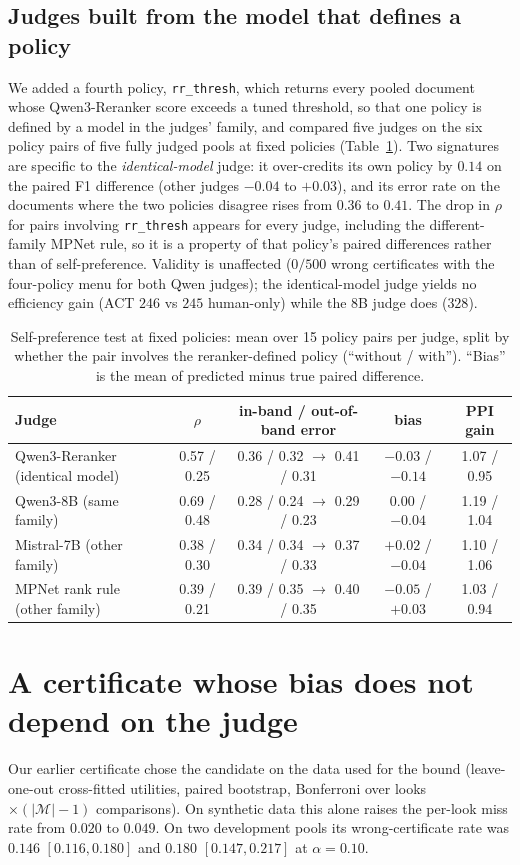 \documentclass{article}
\begin{document}
\subsection{Judges built from the model that defines a policy}\label{sec:selfpref}
We added a fourth policy, \texttt{rr\_thresh}, which returns every pooled document whose Qwen3-Reranker score exceeds a tuned threshold, so that one policy is defined by a model in the judges' family, and compared five judges on the six policy pairs of five fully judged pools at fixed policies (Table~\ref{tab:selfpref}). Two signatures are specific to the \emph{identical-model} judge: it over-credits its own policy by $0.14$ on the paired F1 difference (other judges $-0.04$ to $+0.03$), and its error rate on the documents where the two policies disagree rises from $0.36$ to $0.41$. The drop in $\rho$ for pairs involving \texttt{rr\_thresh} appears for every judge, including the different-family MPNet rule, so it is a property of that policy's paired differences rather than of self-preference. Validity is unaffected ($0/500$ wrong certificates with the four-policy menu for both Qwen judges); the identical-model judge yields no efficiency gain (ACT $246$ vs $245$ human-only) while the 8B judge does ($328$).

\begin{table}[t]\centering\footnotesize
\caption{Self-preference test at fixed policies: mean over 15 policy pairs per judge, split by whether the pair involves the reranker-defined policy (``without / with''). ``Bias'' is the mean of predicted minus true paired difference.}\label{tab:selfpref}
\begin{tabular}{lcccc}\toprule
Judge & $\rho$ & in-band / out-of-band error & bias & PPI gain\\\midrule
Qwen3-Reranker (identical model) & 0.57 / 0.25 & 0.36 / 0.32 $\to$ 0.41 / 0.31 & $-0.03$ / $\mathbf{-0.14}$ & 1.07 / 0.95\\
Qwen3-8B (same family) & 0.69 / 0.48 & 0.28 / 0.24 $\to$ 0.29 / 0.23 & $0.00$ / $-0.04$ & 1.19 / 1.04\\
Mistral-7B (other family) & 0.38 / 0.30 & 0.34 / 0.34 $\to$ 0.37 / 0.33 & $+0.02$ / $-0.04$ & 1.10 / 1.06\\
MPNet rank rule (other family) & 0.39 / 0.21 & 0.39 / 0.35 $\to$ 0.40 / 0.35 & $-0.05$ / $+0.03$ & 1.03 / 0.94\\\bottomrule
\end{tabular}
\end{table}

\section{A certificate whose bias does not depend on the judge}\label{sec:valid}
Our earlier certificate chose the candidate on the data used for the bound (leave-one-out cross-fitted utilities, paired bootstrap, Bonferroni over looks $\times(|\mathcal M|-1)$ comparisons). On synthetic data this alone raises the per-look miss rate from $0.020$ to $0.049$. On two development pools its wrong-certificate rate was $0.146$ $[0.116,0.180]$ and $0.180$ $[0.147,0.217]$ at $\alpha=0.10$.
\end{document}
